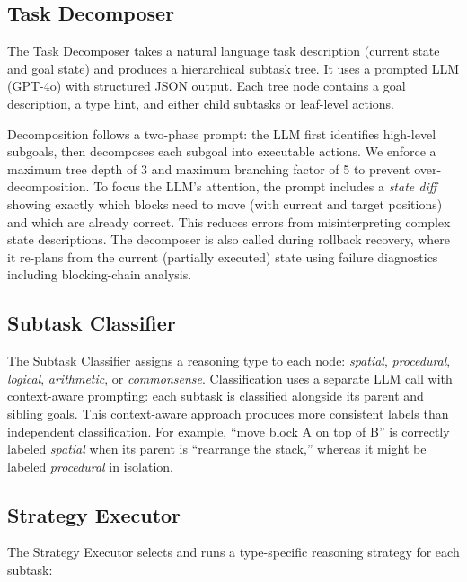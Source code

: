 \documentclass{article}
\begin{document}
\subsection{Task Decomposer}

The Task Decomposer takes a natural language task description (current state and goal state) and produces a hierarchical subtask tree. It uses a prompted LLM (GPT-4o) with structured JSON output. Each tree node contains a goal description, a type hint, and either child subtasks or leaf-level actions.

Decomposition follows a two-phase prompt: the LLM first identifies high-level subgoals, then decomposes each subgoal into executable actions. We enforce a maximum tree depth of 3 and maximum branching factor of 5 to prevent over-decomposition. To focus the LLM's attention, the prompt includes a \textit{state diff} showing exactly which blocks need to move (with current and target positions) and which are already correct. This reduces errors from misinterpreting complex state descriptions. The decomposer is also called during rollback recovery, where it re-plans from the current (partially executed) state using failure diagnostics including blocking-chain analysis.

\subsection{Subtask Classifier}

The Subtask Classifier assigns a reasoning type to each node: \textit{spatial}, \textit{procedural}, \textit{logical}, \textit{arithmetic}, or \textit{commonsense}. Classification uses a separate LLM call with context-aware prompting: each subtask is classified alongside its parent and sibling goals. This context-aware approach produces more consistent labels than independent classification. For example, ``move block A on top of B'' is correctly labeled \textit{spatial} when its parent is ``rearrange the stack,'' whereas it might be labeled \textit{procedural} in isolation.

\subsection{Strategy Executor}

The Strategy Executor selects and runs a type-specific reasoning strategy for each subtask:
\end{document}
